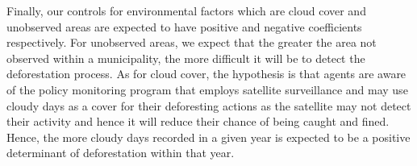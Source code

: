 Finally, our controls for environmental factors which are cloud cover and unobserved areas are expected to have positive and negative coefficients respectively. For unobserved areas, we expect that the greater the area not observed within a municipality, the more difficult it will be to detect the deforestation process. As for cloud cover, the hypothesis is that agents are aware of the policy monitoring program that employs satellite surveillance and may use cloudy days as a cover for their deforesting actions as the satellite may not detect their activity and hence it will reduce their chance of being caught and fined.  Hence, the more cloudy days recorded in a given year is expected to be a positive determinant of deforestation within that year.




						





	

